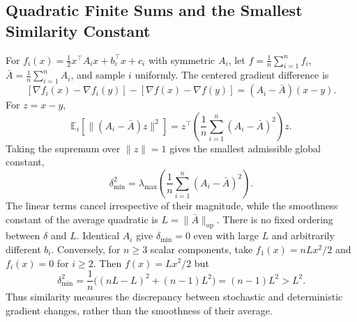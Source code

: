 \subsection{Quadratic Finite Sums and the Smallest Similarity Constant}
\label{app:quadratic-similarity}

For $f_i(x)=\tfrac12x^\top A_ix+b_i^\top x+c_i$ with symmetric
$A_i$, let $f=\frac1n\sum_{i=1}^n f_i$,
$\bar A=\frac1n\sum_{i=1}^n A_i$, and sample $i$ uniformly.
The centered gradient difference is
\begin{equation}
\label{eq:quadratic-difference-noise}
[\nabla f_i(x)-\nabla f_i(y)]-[\nabla f(x)-\nabla f(y)]
=(A_i-\bar A)(x-y).
\end{equation}
For $z=x-y$,
\[
\mathbb E_i[\|(A_i-\bar A)z\|^2]
 =z^\top\!\left(\frac1n\sum_{i=1}^n(A_i-\bar A)^2\right)z.
\]
Taking the supremum over $\|z\|=1$ gives the smallest admissible
global constant,
\begin{equation}
\label{eq:quadratic-optimal-similarity}
\delta_{\min}^2
 =\lambda_{\max}\!\left(\frac1n\sum_{i=1}^n(A_i-\bar A)^2\right).
\end{equation}
The linear terms cancel irrespective of their magnitude, while the
smoothness constant of the average quadratic is
$L=\|\bar A\|_{\mathrm{op}}$. There is no fixed ordering between
$\delta$ and $L$. Identical $A_i$ give $\delta_{\min}=0$ even with
large $L$ and arbitrarily different $b_i$. Conversely, for $n\geq3$
scalar components, take $f_1(x)=nLx^2/2$ and $f_i(x)=0$ for $i\geq2$.
Then $f(x)=Lx^2/2$ but
\[
\delta_{\min}^2
 =\frac1n\bigl((nL-L)^2+(n-1)L^2\bigr)
 =(n-1)L^2>L^2.
\]
Thus similarity measures the discrepancy between stochastic and
deterministic gradient changes, rather than the smoothness of their
average.
